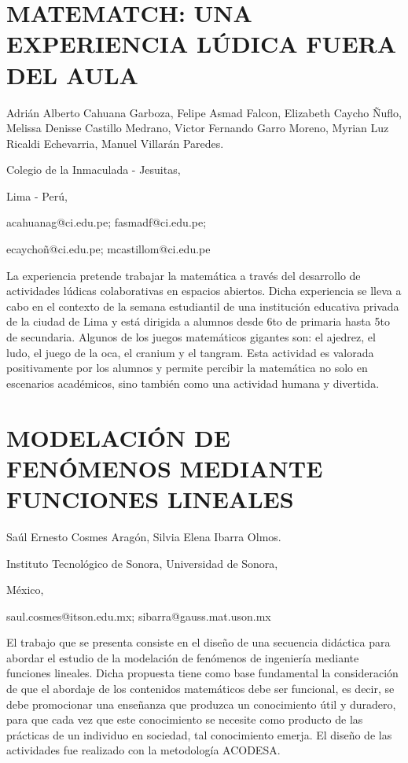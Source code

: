 \section{MATEMATCH: UNA EXPERIENCIA LÚDICA FUERA DEL AULA}

\begin{datos}

Adrián Alberto Cahuana Garboza, Felipe Asmad Falcon, Elizabeth Caycho
Ñuflo, Melissa Denisse Castillo Medrano, Victor Fernando Garro Moreno,
Myrian Luz Ricaldi Echevarria, Manuel Villarán Paredes.

Colegio de la Inmaculada - Jesuitas,

Lima - Perú,

acahuanag@ci.edu.pe; fasmadf@ci.edu.pe; 

ecaychoñ@ci.edu.pe; mcastillom@ci.edu.pe

\end{datos}

La experiencia pretende trabajar la matemática a través del desarrollo
de actividades lúdicas colaborativas en espacios abiertos. Dicha experiencia
se lleva a cabo en el contexto de la semana estudiantil de una institución
educativa privada de la ciudad de Lima y está dirigida a alumnos desde
6to de primaria hasta 5to de secundaria. Algunos de los juegos matemáticos
gigantes son: el ajedrez, el ludo, el juego de la oca, el cranium
y el tangram. Esta actividad es valorada positivamente por los alumnos
y permite percibir la matemática no solo en escenarios académicos,
sino también como una actividad humana y divertida.


\section{MODELACIÓN DE FENÓMENOS MEDIANTE FUNCIONES LINEALES}

\begin{datos}

Saúl Ernesto Cosmes Aragón, Silvia Elena Ibarra Olmos.

Instituto Tecnológico de Sonora, Universidad de Sonora,

México,

saul.cosmes@itson.edu.mx; sibarra@gauss.mat.uson.mx 

\end{datos}

El trabajo que se presenta consiste en el diseño de una secuencia
didáctica para abordar el estudio de la modelación de fenómenos de
ingeniería mediante funciones lineales. Dicha propuesta tiene como
base fundamental la consideración de que el abordaje de los contenidos
matemáticos debe ser funcional, es decir, se debe promocionar una
enseñanza que produzca un conocimiento útil y duradero, para que cada
vez que este conocimiento se necesite como producto de las prácticas
de un individuo en sociedad, tal conocimiento emerja. El diseño de
las actividades fue realizado con la metodología ACODESA.



